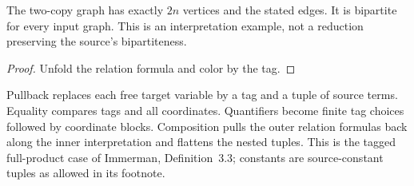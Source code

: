 \begin{theorem}
  \label{thm:desc-double-cover}
  \leanok
  The two-copy graph has exactly $2n$ vertices and the stated edges. It is
  bipartite for every input graph. This is an interpretation example, not a
  reduction preserving the source's bipartiteness.
\end{theorem}
\begin{proof}
  \leanok
  Unfold the relation formula and color by the tag.
\end{proof}

\begin{definition}
  \label{def:desc-tagged-pullback}
  \leanok
  Pullback replaces each free target variable by a tag and a tuple of source
  terms. Equality compares tags and all coordinates. Quantifiers become finite
  tag choices followed by coordinate blocks. Composition pulls the outer relation
  formulas back along the inner interpretation and flattens the nested tuples.
  This is the tagged full-product case of Immerman, Definition~3.3; constants are
  source-constant tuples as allowed in its footnote.
\end{definition}

